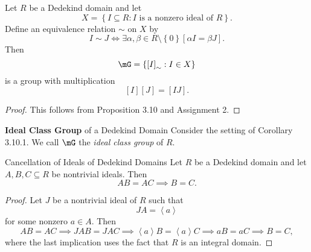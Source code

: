 \documentclass[pmath441]{subfiles}
\begin{document}
    \begin{cor}{}
        Let $R$ be a Dedekind domain and let
        \begin{equation*}
            X = \left\lbrace I\subseteq R:\text{$I$ is a nonzero ideal of $R$} \right\rbrace.
        \end{equation*}
        Define an equivalence relation $\sim$ on $X$ by
        \begin{equation*}
            I\sim J\iff \exists \alpha,\beta\in R\setminus \left\lbrace 0 \right\rbrace \left[ \alpha I = \beta J \right].
        \end{equation*}
        Then
        \begin{equation*}
            \mG = \left\lbrace \left[ I \right]_{\sim}: I\in X \right\rbrace
        \end{equation*}
        is a group with multiplication
        \begin{equation*}
            \left[ I \right]\left[ J \right] = \left[ IJ \right].
        \end{equation*}
    \end{cor}	

    \begin{proof}
        This follows from Proposition 3.10 and Assignment 2.
    \end{proof}

    \begin{definition}{\textbf{Ideal Class Group} of a Dedekind Domain}
        Consider the setting of Corollary 3.10.1. We call $\mG$ the \emph{ideal class group} of $R$.
    \end{definition}

    \clearpage
    
    \begin{prop}{Cancellation of Ideals of Dedekind Domains}
        Let $R$ be a Dedekind domain and let $A,B,C\subseteq R$ be nontrivial ideals. Then
        \begin{equation*}
            AB = AC \implies B=C.
        \end{equation*}
    \end{prop}

    \vspace{-\preskip}
    
    \begin{proof}
        Let $J$ be a nontrivial ideal of $R$ such that
        \begin{equation*}
            JA = \left< a \right> 
        \end{equation*}
        for some nonzero $a\in A$. Then
        \begin{equation*}
            AB = AC \implies JAB = JAC \implies \left< a \right>B = \left< a \right>C \implies aB = aC \implies B=C,  
        \end{equation*}
        where the last implication uses the fact that $R$ is an integral domain.
    \end{proof}
    
\end{document}
